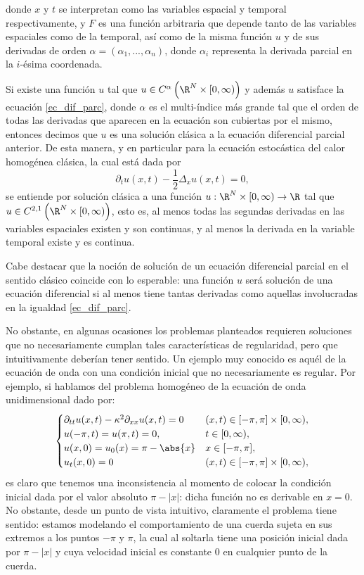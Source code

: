 donde $x$ y $t$ se interpretan como las variables espacial y temporal respectivamente, y $F$ es una función arbitraria que depende tanto de las variables espaciales como de la temporal, así como de la misma función $u$ y de sus derivadas de orden $\alpha=(\alpha_1,...,\alpha_n)$, donde $\alpha_i$ representa la derivada parcial en la $i$-ésima coordenada.

Si existe una función $u$ tal que $u\in C^{\alpha}\left(\R^{N}\times [0,\infty)\right)$ y además $u$ satisface la ecuación \eqref{ec_dif_parc}, donde $\alpha$ es el multi-índice más grande tal que el orden de todas las derivadas que aparecen en la ecuación son cubiertas por el mismo, entonces decimos que $u$ es una solución clásica a la ecuación diferencial parcial anterior. De esta manera, y en particular para la ecuación estocástica del calor homogénea clásica, la cual está dada por 
\[
    \partial_tu(x,t)-\frac{1}{2}\Delta_x u(x,t)=0,
\]
se entiende por solución clásica a una función $u:\R^{N}\times[0,\infty)\to \R$ tal que $u\in C^{2,1}\left(\R^{N}\times [0,\infty)\right)$, esto es, al menos todas las segundas derivadas en las variables espaciales existen y son continuas, y al menos la derivada en la variable temporal existe y es continua. 

Cabe destacar que la noción de solución de un ecuación diferencial parcial en el sentido clásico coincide con lo esperable: una función $u$ será solución de una ecuación diferencial si al menos tiene tantas derivadas como aquellas involucradas en la igualdad \eqref{ec_dif_parc}.

No obstante, en algunas ocasiones los problemas planteados requieren soluciones que no necesariamente cumplan tales características de regularidad, pero que intuitivamente deberían tener sentido.
 Un ejemplo muy conocido es aquél de la ecuación de onda con una condición inicial que no necesariamente es regular. Por ejemplo, si hablamos del problema homogéneo de la ecuación de onda unidimensional dado por:
\begin{equation}\label{wave_eq_sobolev}
    \begin{cases}
        \partial_{tt}u(x,t)-\kappa^2\partial_{xx}u(x,t)=0 & (x,t)\in [-\pi,\pi]\times[0,\infty),\\
        u(-\pi,t)=u(\pi,t)=0, & t\in [0,\infty),\\
        u(x,0)=u_0(x)=\pi-\abs{x} & x\in [-\pi,\pi],\\
        u_t(x,0)=0 & (x,t) \in [-\pi,\pi]\times[0,\infty),\\
    \end{cases}
\end{equation}
es claro que tenemos una inconsistencia al momento de colocar la condición inicial dada por el valor absoluto $\pi-|x|$: dicha función no es derivable en $x=0$. No obstante, desde un punto de vista intuitivo, claramente el problema tiene sentido: estamos modelando el comportamiento de una cuerda sujeta en sus extremos a los puntos $-\pi$ y $\pi$, la cual al soltarla tiene una posición inicial dada por $\pi-|x|$ y cuya velocidad inicial es constante $0$ en cualquier punto de la cuerda.\newline


